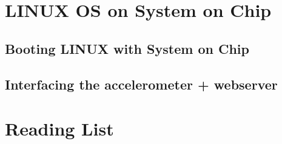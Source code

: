 \documentclass[letterpaper, portrait, margin=0.8in]{article}
\begin{document}
\clearpage

\section{LINUX OS on System on Chip}





\subsection{Booting LINUX with System on Chip}

\subsection{Interfacing the accelerometer + webserver}
 
 
\newpage
\section*{Reading List}


  
\end{document}
